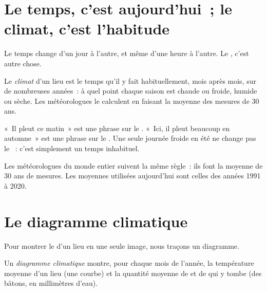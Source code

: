 \section{Le temps, c'est aujourd'hui~; le climat, c'est l'habitude}

Le temps change d'un jour à l'autre, et même d'une heure à l'autre. Le
, c'est autre chose.

\begin{definition}[Climat]\label{def:g5:weather-and-climate:climate}
Le \emph{climat} d'un lieu est le temps qu'il y fait
habituellement, mois après mois, sur de nombreuses années~: à quel point
chaque saison est chaude ou froide, humide ou sèche. Les météorologues le
calculent en faisant la moyenne des mesures de 30 ans.
\end{definition}

«~Il pleut ce matin~» est une phrase sur le . «~Ici, il
pleut beaucoup en automne~» est une phrase sur le . Une seule journée
froide en été ne change pas le ~: c'est simplement un temps
inhabituel.

Les météorologues du monde entier suivent la même règle~: ils font la
moyenne de 30 ans de mesures. Les moyennes utilisées aujourd'hui sont
celles des années 1991 à 2020.

\section{Le diagramme climatique}

Pour montrer le  d'un lieu en une seule image, nous traçons un diagramme.

\begin{definition}\label{def:g5:weather-and-climate:climate-chart}
Un \emph{diagramme climatique} montre, pour
chaque mois de l'année, la température moyenne d'un lieu (une courbe) et la
quantité moyenne de  et de  qui y tombe (des bâtons, en
millimètres d'eau).
\end{definition}

